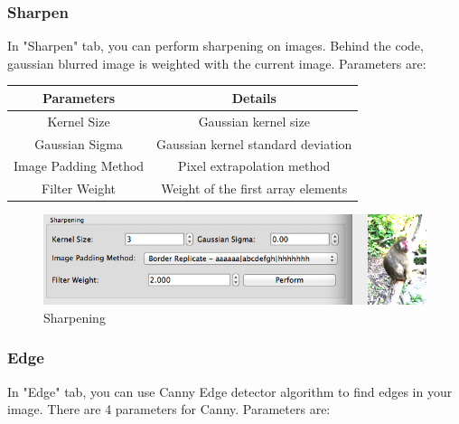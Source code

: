 \documentclass{article}
\begin{document}
\subsubsection{Sharpen}
In "Sharpen" tab, you can perform sharpening on images. Behind the code, gaussian blurred image is weighted with the current image. Parameters are:

\begin{table}[H]
\begin{center}
\begin{tabular}{|c|c|l|l|l|}
\hline
\textbf{Parameters}  & \multicolumn{4}{|c|}{\textbf{Details}}                   \\ \hline
Kernel Size          & \multicolumn{4}{|c|}{Gaussian kernel size}               \\ \hline
Gaussian Sigma       & \multicolumn{4}{|c|}{Gaussian kernel standard deviation} \\ \hline
Image Padding Method & \multicolumn{4}{|c|}{Pixel extrapolation method} \\ \hline
Filter Weight        & \multicolumn{4}{|c|}{Weight of the first array elements} \\ \hline
\end{tabular}
\end{center}
\end{table}


\begin{figure}[H]
\begin{center}
\includegraphics[scale=0.5]{toolboxSharpen.png}
\caption{Sharpening}
\end{center}
\end{figure}	

\subsubsection{Edge}
In "Edge" tab, you can use Canny Edge detector algorithm to find edges in your image. There are 4 parameters for Canny. Parameters are:
\end{document}
